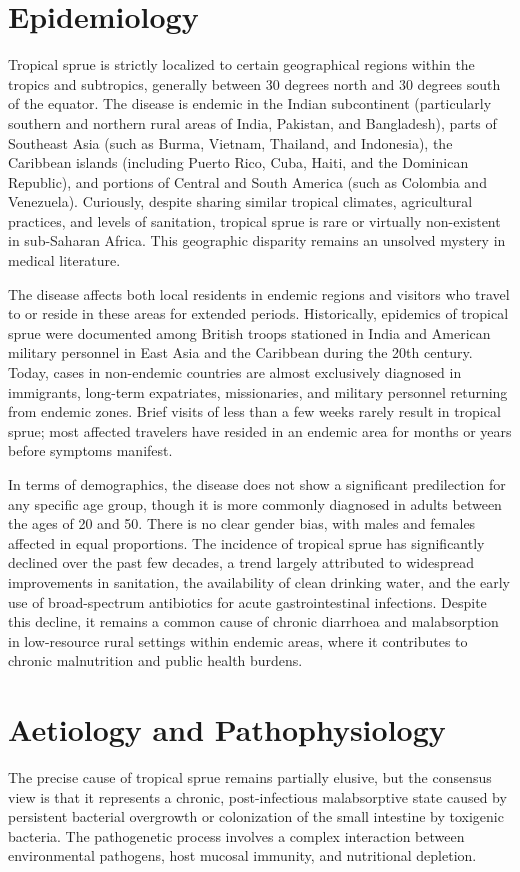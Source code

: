 \section*{Epidemiology}
Tropical sprue is strictly localized to certain geographical regions within the tropics and subtropics, generally between 30 degrees north and 30 degrees south of the equator. The disease is endemic in the Indian subcontinent (particularly southern and northern rural areas of India, Pakistan, and Bangladesh), parts of Southeast Asia (such as Burma, Vietnam, Thailand, and Indonesia), the Caribbean islands (including Puerto Rico, Cuba, Haiti, and the Dominican Republic), and portions of Central and South America (such as Colombia and Venezuela). Curiously, despite sharing similar tropical climates, agricultural practices, and levels of sanitation, tropical sprue is rare or virtually non-existent in sub-Saharan Africa. This geographic disparity remains an unsolved mystery in medical literature.

The disease affects both local residents in endemic regions and visitors who travel to or reside in these areas for extended periods. Historically, epidemics of tropical sprue were documented among British troops stationed in India and American military personnel in East Asia and the Caribbean during the 20th century. Today, cases in non-endemic countries are almost exclusively diagnosed in immigrants, long-term expatriates, missionaries, and military personnel returning from endemic zones. Brief visits of less than a few weeks rarely result in tropical sprue; most affected travelers have resided in an endemic area for months or years before symptoms manifest.

In terms of demographics, the disease does not show a significant predilection for any specific age group, though it is more commonly diagnosed in adults between the ages of 20 and 50. There is no clear gender bias, with males and females affected in equal proportions. The incidence of tropical sprue has significantly declined over the past few decades, a trend largely attributed to widespread improvements in sanitation, the availability of clean drinking water, and the early use of broad-spectrum antibiotics for acute gastrointestinal infections. Despite this decline, it remains a common cause of chronic diarrhoea and malabsorption in low-resource rural settings within endemic areas, where it contributes to chronic malnutrition and public health burdens.

\section*{Aetiology and Pathophysiology}
The precise cause of tropical sprue remains partially elusive, but the consensus view is that it represents a chronic, post-infectious malabsorptive state caused by persistent bacterial overgrowth or colonization of the small intestine by toxigenic bacteria. The pathogenetic process involves a complex interaction between environmental pathogens, host mucosal immunity, and nutritional depletion.

